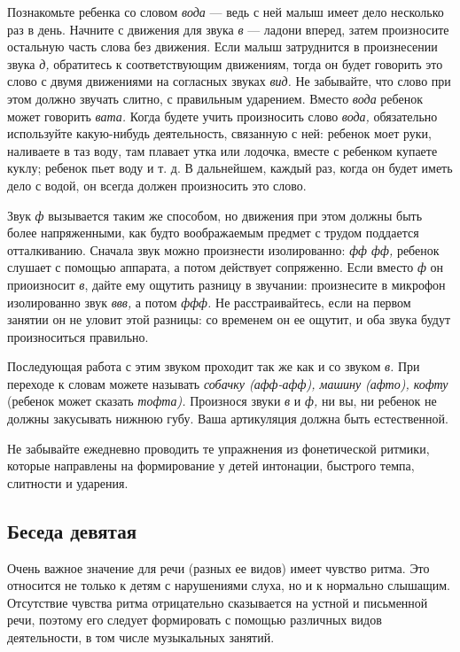 \documentclass{book}
\renewcommand{\emph}[1]{\textit{#1}}
\begin{document}
Познакомьте ребенка со словом \emph{вода} --- ведь с ней малыш имеет
дело несколько раз в день. Начните с движения для звука \emph{в} ---
ладони вперед, затем произносите остальную часть слова без движения.
Если малыш затруднится в произнесении звука \emph{д,} обратитесь к
соответствующим движениям, тогда он будет говорить это слово с двумя
движениями на согласных звуках \emph{вид.} Не забывайте, что слово при
этом должно звучать слитно, с правильным ударением. Вместо \emph{вода}
ребенок может говорить \emph{вата.} Когда будете учить произносить слово
\emph{вода,} обязательно используйте какую-нибудь деятельность,
связанную с ней: ребенок моет руки, наливаете в таз воду, там плавает
утка или лодочка, вместе с ребенком купаете куклу; ребенок пьет воду и
т. д. В дальнейшем, каждый раз, когда он будет иметь дело с водой, он
всегда должен произносить это слово.

Звук \emph{ф} вызывается таким же способом, но движения при этом должны
быть более напряженными, как будто воображаемым предмет с трудом
поддается отталкиванию. Сначала звук можно произнести изолированно:
\emph{фф фф,} ребенок слушает с помощью аппарата, а потом действует
сопряженно. Если вместо \emph{ф} он приоизносит \emph{в}, дайте ему
ощутить разницу в звучании: произнесите в микрофон изолированно звук
\emph{ввв,} а потом \emph{ффф.} Не расстраивайтесь, если на первом
занятии он не уловит этой разницы: со временем он ее ощутит, и оба звука
будут произноситься правильно.

Последующая работа с этим звуком проходит так же как и со звуком
\emph{в.} При переходе к словам можете называть \emph{собачку (афф-афф),
машину (афто), кофту} (ребенок может сказать \emph{тофта).} Произнося
звуки \emph{в} и \emph{ф,} ни вы, ни ребенок не должны закусывать нижнюю
губу. Ваша артикуляция должна быть естественной.

Не забывайте ежедневно проводить те упражнения из фонетической ритмики,
которые направлены на формирование у детей интонации, быстрого темпа,
слитности и ударения.

\subsection*{Беседа девятая}

Очень важное значение для речи (разных ее видов) имеет чувство ритма.
Это относится не только к детям с нарушениями слуха, но и к нормально
слышащим. Отсутствие чувства ритма отрицательно сказывается на устной и
письменной речи, поэтому его следует формировать с помощью различных
видов деятельности, в том числе музыкальных занятий.
\end{document}
